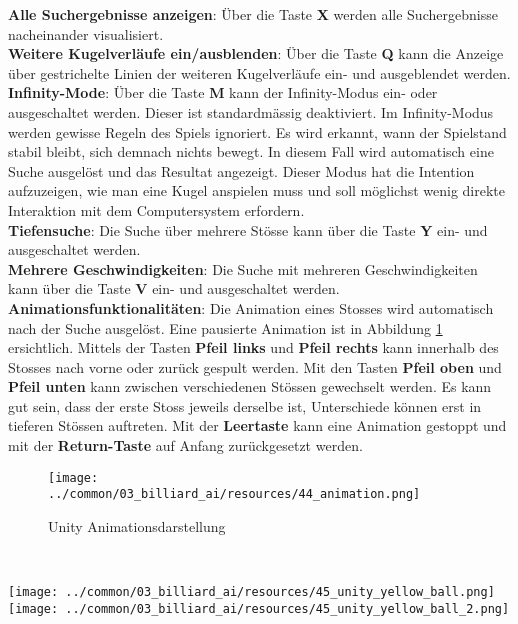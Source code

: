 \textbf{Alle Suchergebnisse anzeigen}: Über die Taste \textbf{X} werden alle Suchergebnisse nacheinander visualisiert. \\
\textbf{Weitere Kugelverläufe ein/ausblenden}: Über die Taste \textbf{Q} kann die Anzeige über gestrichelte Linien der weiteren
Kugelverläufe ein- und ausgeblendet werden.\\
\textbf{Infinity-Mode}: Über die Taste \textbf{M} kann der Infinity-Modus ein- oder ausgeschaltet werden.
Dieser ist standardmässig deaktiviert. Im Infinity-Modus werden gewisse Regeln des Spiels ignoriert. Es wird erkannt,
wann der Spielstand stabil bleibt, sich demnach nichts bewegt. In diesem Fall wird automatisch eine Suche ausgelöst
und das Resultat angezeigt. Dieser Modus hat die Intention aufzuzeigen, wie man eine Kugel anspielen muss und soll
möglichst wenig direkte Interaktion mit dem Computersystem erfordern.\\
\textbf{Tiefensuche}: Die Suche über mehrere Stösse kann über die Taste \textbf{Y} ein- und ausgeschaltet werden.\\
\textbf{Mehrere Geschwindigkeiten}: Die Suche mit mehreren Geschwindigkeiten kann über die Taste \textbf{V} ein- und ausgeschaltet werden.\\
\textbf{Animationsfunktionalitäten}: Die Animation eines Stosses wird automatisch nach der Suche
ausgelöst. Eine pausierte Animation ist in Abbildung \ref{fig:unity_animation} ersichtlich.
Mittels der Tasten \textbf{Pfeil links} und \textbf{Pfeil rechts} kann innerhalb des Stosses nach vorne oder zurück
gespult werden. Mit den Tasten \textbf{Pfeil oben} und \textbf{Pfeil unten} kann zwischen verschiedenen Stössen gewechselt
werden. Es kann gut sein, dass der erste Stoss jeweils derselbe ist, Unterschiede können erst in tieferen Stössen auftreten.
Mit der \textbf{Leertaste} kann eine Animation gestoppt und mit der \textbf{Return-Taste} auf Anfang zurückgesetzt werden.
\begin{figure}[h!]
    \begin{center}
        \texttt{[image: ../common/03\_billiard\_ai/resources/44\_animation.png]}
    \end{center}
    \caption{Unity Animationsdarstellung}
    \label{fig:unity_animation}
\end{figure}\\
\begin{minipage}[t]{0.2\textwidth}
    \begin{center}
        \texttt{[image: ../common/03\_billiard\_ai/resources/45\_unity\_yellow\_ball.png]}
        \texttt{[image: ../common/03\_billiard\_ai/resources/45\_unity\_yellow\_ball\_2.png]}
    \end{center}
\end{minipage}\hfill
